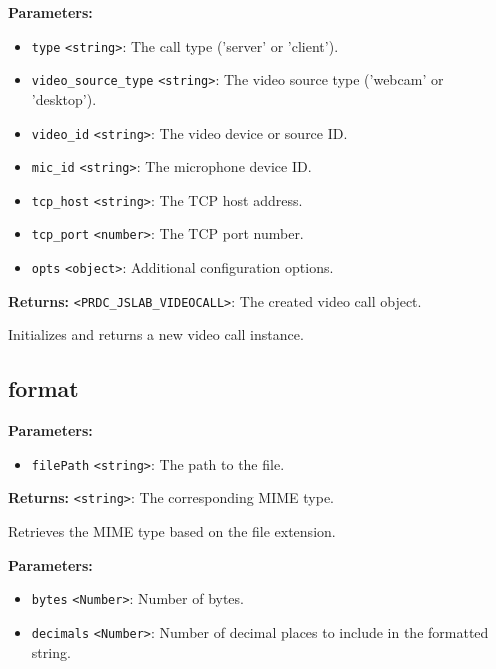 \documentclass[12pt,a4paper]{article}
\begin{document}
\noindent \textbf{Parameters:}
\begin{itemize}
  \item \texttt{type} \texttt{<string>}: The call type ('server' or 'client').
  \item \texttt{video\_source\_type} \texttt{<string>}: The video source type ('webcam' or 'desktop').
  \item \texttt{video\_id} \texttt{<string>}: The video device or source ID.
  \item \texttt{mic\_id} \texttt{<string>}: The microphone device ID.
  \item \texttt{tcp\_host} \texttt{<string>}: The TCP host address.
  \item \texttt{tcp\_port} \texttt{<number>}: The TCP port number.
  \item \texttt{opts} \texttt{<object>}: Additional configuration options.
\end{itemize}

\noindent \textbf{Returns:} \texttt{<PRDC\_JSLAB\_VIDEOCALL>}: The created video call object.

\noindent Initializes and returns a new video call instance.


\subsection{format}
\vspace{5mm}
\noindent {}


\noindent \textbf{Parameters:}
\begin{itemize}
  \item \texttt{filePath} \texttt{<string>}: The path to the file.
\end{itemize}

\noindent \textbf{Returns:} \texttt{<string>}: The corresponding MIME type.

\noindent Retrieves the MIME type based on the file extension.

\vspace{5mm}
\noindent {}


\noindent \textbf{Parameters:}
\begin{itemize}
  \item \texttt{bytes} \texttt{<Number>}: Number of bytes.
  \item \texttt{decimals} \texttt{<Number>}: Number of decimal places to include in the formatted string.
\end{itemize}
\end{document}
